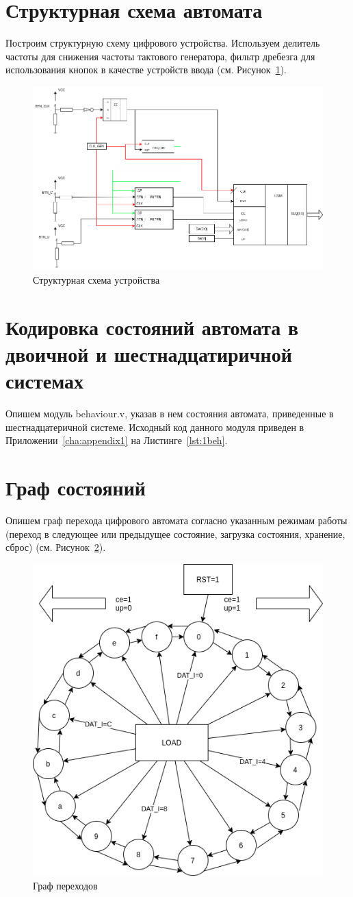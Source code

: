 \section{Структурная схема автомата}
Построим структурную схему цифрового устройства. Используем делитель частоты для снижения частоты тактового генератора, фильтр дребезга для использования кнопок в качестве устройств ввода (см. Рисунок~\ref{fig:fsm-struct}).
\begin{figure}[htpb]
	\centering
	\includegraphics[width=\linewidth]{course-plis/images/lab2/fsm-struct}
	\caption{Структурная схема  устройства}
	\label{fig:fsm-struct}
\end{figure}


\section{Кодировка состояний автомата в двоичной и шестнадцатиричной системах}
Опишем модуль behaviour.v, указав в нем состояния автомата, приведенные в шестнадцатеричной системе.
Исходный код данного модуля приведен в Приложении~\ref{cha:appendix1} на Листинге~\ref{lst:1beh}.


\section{Граф состояний}
Опишем граф перехода цифрового автомата согласно указанным режимам работы (переход в следующее или предыдущее состояние, загрузка состояния, хранение, сброс) (см. Рисунок~\ref{fig:graph}).
\begin{figure}[h!]
	\centering
	\includegraphics[width=0.4\linewidth]{course-plis/images/lab2/graph}
	\caption{Граф переходов}
	\label{fig:graph}
\end{figure}

